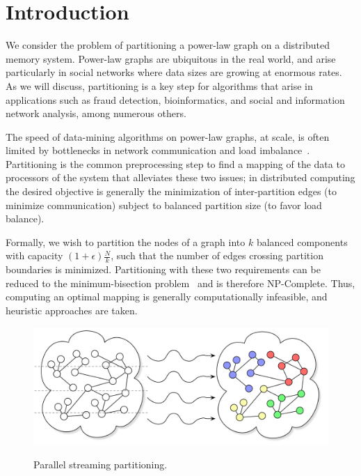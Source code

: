 \section{Introduction} \label{sec:intro}
We consider the problem of partitioning a power-law graph on a distributed memory system. Power-law graphs are ubiquitous in the real world, and arise particularly in social networks where data sizes are growing at enormous rates. As we will discuss, partitioning is a key step for algorithms that arise in applications such as fraud detection, bioinformatics, and social and information network analysis, among numerous others.

The speed of data-mining algorithms on power-law graphs, at scale, is often limited by bottlenecks in network communication and load imbalance~\cite{challenglums}. Partitioning is the common preprocessing step to find a mapping of the data to processors of the system that alleviates these two issues; in distributed computing the desired objective is generally the minimization of inter-partition edges (to minimize communication) subject to balanced partition size (to favor load balance).

Formally, we wish to partition the nodes of a graph into $k$ balanced components with capacity $(1+\epsilon)\frac{N}{k}$, such that the number of edges crossing partition boundaries is minimized. Partitioning with these two requirements can be reduced to the minimum-bisection problem~\cite{Garey:1979:CIG:578533} and is therefore NP-Complete. 
Thus, computing an optimal mapping is generally computationally infeasible, and heuristic approaches are taken. 

\begin{figure}[ht]
\centering
  \includegraphics[width=0.7\columnwidth]{figures/coverfig.pdf}
  \label{fig:coverfig}
  \caption{Parallel streaming partitioning.}
\end{figure}

